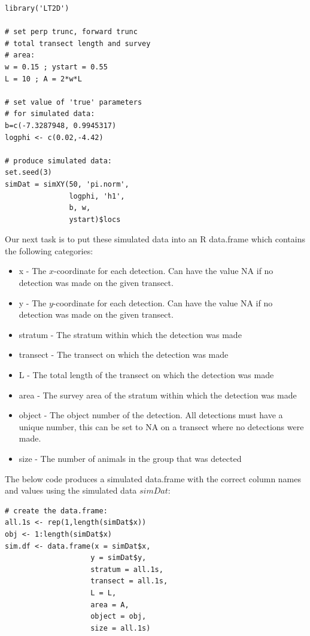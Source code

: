\documentclass[11pt]{article}
\begin{document}
\begin{multicols}{2}
\begingroup
\small
\begin{lstlisting}
library('LT2D')

# set perp trunc, forward trunc
# total transect length and survey
# area:
w = 0.15 ; ystart = 0.55
L = 10 ; A = 2*w*L

# set value of 'true' parameters
# for simulated data:
b=c(-7.3287948, 0.9945317)
logphi <- c(0.02,-4.42)

# produce simulated data:
set.seed(3)
simDat = simXY(50, 'pi.norm',
               logphi, 'h1', 
               b, w, 
               ystart)$locs
\end{lstlisting}
\endgroup

Our next task is to put these simulated data into an R data.frame which contains the following categories:

\begin{itemize}
\item x - The $x$-coordinate for each detection. Can have the value NA if no detection was made on the given transect.
\item y - The $y$-coordinate for each detection. Can have the value NA if no detection was made on the given transect.
\item stratum - The stratum within which the detection was made
\item transect - The transect on which the detection was made
\item L - The total length of the transect on which the detection was made
\item area - The survey area of the stratum within which the detection was made
\item object - The object number of the detection. All detections must have a unique number, this can be set to NA on a transect where no detections were made.
\item size - The number of animals in the group that was detected
\end{itemize}

The below code produces a simulated data.frame with the correct column names and values using the simulated data $simDat$:

\begingroup
\small
\begin{lstlisting}
# create the data.frame:
all.1s <- rep(1,length(simDat$x))
obj <- 1:length(simDat$x)
sim.df <- data.frame(x = simDat$x,
                    y = simDat$y,
                    stratum = all.1s,
                    transect = all.1s,
                    L = L,
                    area = A,
                    object = obj,
                    size = all.1s)
\end{lstlisting}
\endgroup


\end{multicols}
\end{document}
